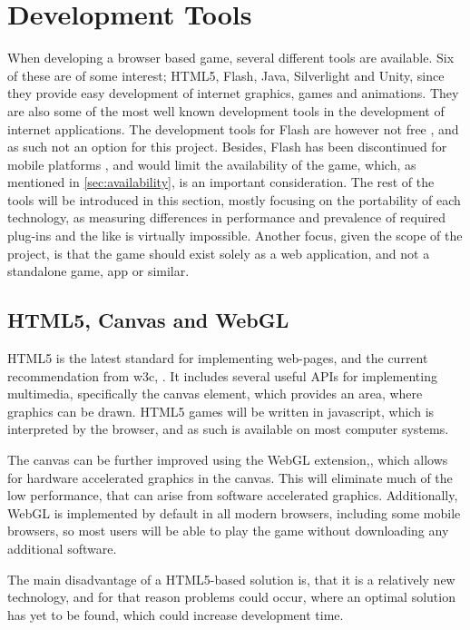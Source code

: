 \section{Development Tools}
\label{sec:tools}

When developing a browser based game, several different tools are available.
Six of these are of some interest; HTML5, Flash, Java, Silverlight and Unity, since they provide easy development of internet graphics, games and animations.
They are also some of the most well known development tools in the development of internet applications.
The development tools for Flash are however not free \cite{adobe13}, and as such not an option for this project.
Besides, Flash has been discontinued for mobile platforms \cite{adobe12}, and would limit the availability of the game, which, as mentioned in \autoref{sec:availability}, is an important consideration.
The rest of the tools will be introduced in this section, mostly focusing on the portability of each technology, as measuring differences in performance and prevalence of required plug-ins and the like is virtually impossible.
Another focus, given the scope of the project, is that the game should exist solely as a web application, and not a standalone game, app or similar.

\subsection{HTML5, Canvas and WebGL}
HTML5 is the latest standard for implementing web-pages, and the current recommendation from \ac{w3c}, \cite{html513}.
It includes several useful APIs for implementing multimedia, specifically the canvas element, which provides an area, where graphics can be drawn.
HTML5 games will be written in javascript, which is interpreted by the browser, and as such is available on most computer systems.\newline

The canvas can be further improved using the WebGL extension,\cite{khronos13}, which allows for hardware accelerated graphics in the canvas. 
This will eliminate much of the low performance, that can arise from software accelerated graphics.
Additionally, WebGL is implemented by default in all modern browsers, including some mobile browsers, so most users will be able to play the game without downloading any additional software.

The main disadvantage of a HTML5-based solution is, that it is a relatively new technology, and for that reason problems could occur, where an optimal solution has yet to be found, which could increase development time.

